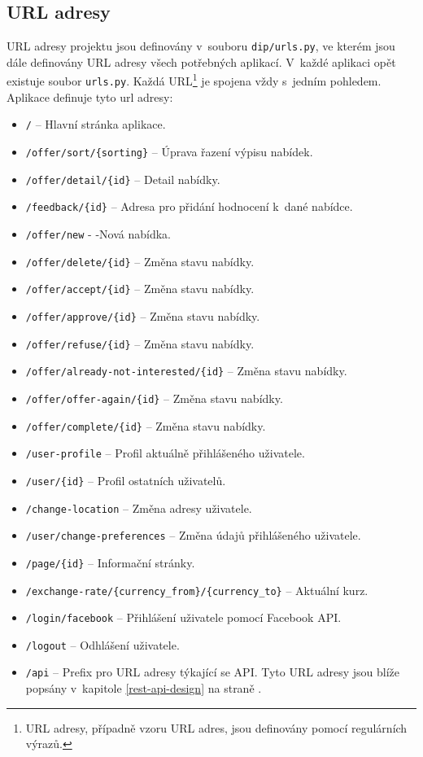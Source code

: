 \subsection{URL adresy}
URL adresy projektu jsou definovány v~souboru \texttt{dip/urls.py}, ve kterém jsou dále definovány URL adresy všech potřebných aplikací. V~každé aplikaci opět existuje soubor \texttt{urls.py}. Každá URL\footnote{URL adresy, případně vzoru URL adres, jsou definovány pomocí regulárních výrazů.} je spojena vždy s~jedním pohledem. Aplikace definuje tyto url adresy:
\begin{itemize}
    \item \texttt{/} -- Hlavní stránka aplikace.
    \item \texttt{/offer/sort/\{sorting\}} -- Úprava řazení výpisu nabídek.
    \item \texttt{/offer/detail/\{id\}} -- Detail nabídky.
    \item \texttt{/feedback/\{id\}} -- Adresa pro přidání hodnocení k~dané nabídce.
    \item \texttt{/offer/new} - -Nová nabídka.
    \item \texttt{/offer/delete/\{id\}} -- Změna stavu nabídky.
    \item \texttt{/offer/accept/\{id\}} -- Změna stavu nabídky.
    \item \texttt{/offer/approve/\{id\}} -- Změna stavu nabídky.
    \item \texttt{/offer/refuse/\{id\}} -- Změna stavu nabídky.
    \item \texttt{/offer/already-not-interested/\{id\}} -- Změna stavu nabídky.
    \item \texttt{/offer/offer-again/\{id\}} -- Změna stavu nabídky.
    \item \texttt{/offer/complete/\{id\}} -- Změna stavu nabídky.
    \item \texttt{/user-profile} -- Profil aktuálně přihlášeného uživatele.
    \item \texttt{/user/\{id\}} -- Profil ostatních uživatelů.
    \item \texttt{/change-location} -- Změna adresy uživatele.
    \item \texttt{/user/change-preferences} -- Změna údajů přihlášeného uživatele.
    \item \texttt{/page/\{id\}} -- Informační stránky.
    \item \texttt{/exchange-rate/\{currency\_from\}/\{currency\_to\}} -- Aktuální kurz.
    \item \texttt{/login/facebook} -- Přihlášení uživatele pomocí Facebook API.
    \item \texttt{/logout} -- Odhlášení uživatele.
    \item \texttt{/api} -- Prefix pro URL adresy týkající se API. Tyto URL adresy jsou blíže popsány v~kapitole \ref{rest-api-design} na straně \pageref{rest-api-design}.
\end{itemize}

